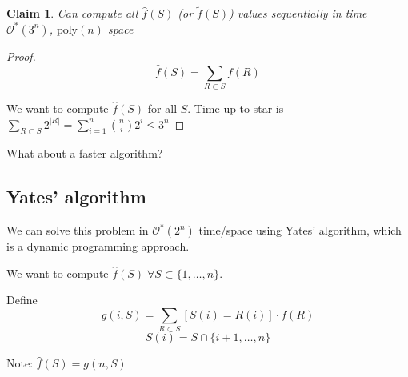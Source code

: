\documentclass[11pt]{article}
\newtheorem{claim}[theorem]{Claim}
\newcommand{\Oh}{\mathcal{O}}
\newcommand{\Ohstar}{\Oh^\ast}
\newcommand{\poly}{\text{poly}}
\begin{document}
\begin{claim}
Can compute all $\hat{f}(S)$ (or $\tilde{f}(S)$) values sequentially in time $\Ohstar(3^n)$, $\poly(n)$ space
\end{claim}
\begin{proof}

\[ \hat{f}(S) = \sum_{R \subset S} f(R) \]

We want to compute $\hat{f}(S)$ for all $S$. Time up to star is $\sum_{R \subset S} 2^{|R|} = \sum_{i=1}^n {n \choose i} 2^i \leq 3^n$

\end{proof}

What about a faster algorithm?

\subsection{Yates' algorithm}

We can solve this problem in $\Ohstar(2^n)$ time/space using Yates' algorithm, which is a dynamic programming approach.


We want to compute $\hat{f}(S) \; \forall S \subset \{1, \ldots, n\}$. 

Define
\[
g(i,S) = \sum_{R \subset S} [S(i) = R(i)] \cdot f(R)
\]
\[
S(i) = S \cap \{i+1,\ldots,n\}
\]

Note: $\hat{f}(S) = g(n,S)$
\end{document}
